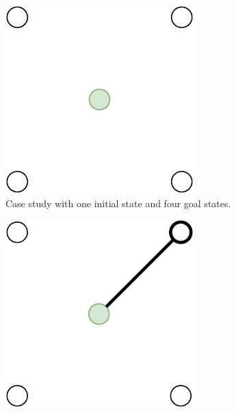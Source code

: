 \begin{figure}[ht!]
  \centering
  \begin{subfigure}[b]{0.30\linewidth}
    \centering\includegraphics[width=.85\linewidth]{chapter_5_mapping/imgs/mg_all.pdf}
    \caption{\label{fig:ch5_mg_tsp_1} Case study with one initial state and four goal states.}
  \end{subfigure}
  \hfill
  \begin{subfigure}[b]{0.30\linewidth}
    \centering\includegraphics[width=.85\linewidth]{chapter_5_mapping/imgs/mg_sg_2.pdf}

\end{subfigure}
\end{figure}
